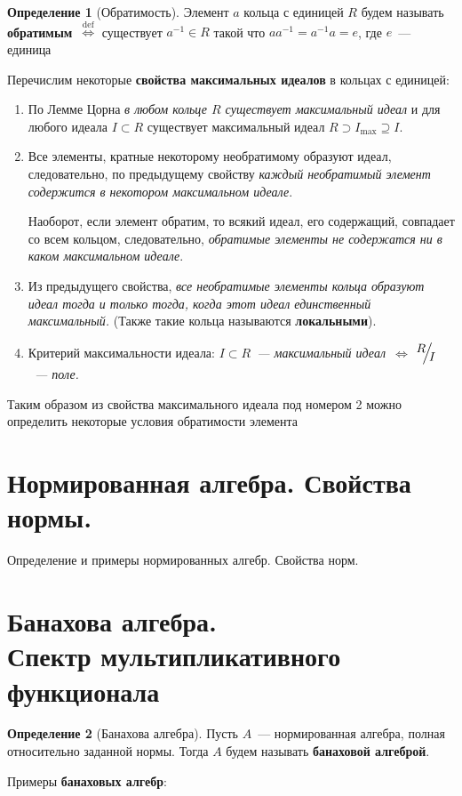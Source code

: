 \documentclass[12pt]{extarticle}
\theoremstyle{definition}
\newtheorem{definition}{\indent Определение}[section]
\newcommand{\factor}[2]{\raisebox{.35em}{$#1$}\kern-.27em\Big/\kern-.27em\raisebox{-.35em}{$#2$}}
\newcommand{\iffdef}{\stackrel{\mathrm{def}}{\iff}}
\begin{document}
    \begin{definition}[Обратимость]\label{def:Invertibility}
        Элемент $a$ кольца с единицей $R$ будем называть \textbf{обратимым}~$\iffdef$ существует $a^{-1}\in R$ такой что $aa^{-1}=a^{-1}a=e$, где $e$~--- единица
    \end{definition}
    Перечислим некоторые \textbf{свойства максимальных идеалов} в кольцах с единицей:
    \begin{enumerate}
        \item По Лемме Цорна \textit{в любом кольце $R$ существует максимальный идеал} и для любого идеала $I\subset R$ существует максимальный идеал $R\supset I_{\max}\supseteq I$.
        \item Все элементы, кратные некоторому необратимому образуют идеал, следовательно, по предыдущему свойству \textit{каждый необратимый элемент  содержится в некотором максимальном идеале}.

        Наоборот, если элемент обратим, то всякий идеал, его содержащий, совпадает со всем кольцом, следовательно, \textit{обратимые элементы не содержатся ни в каком максимальном идеале}.
        \item Из предыдущего свойства, \textit{все необратимые элементы кольца образуют идеал тогда и только тогда, когда этот идеал единственный максимальный.} (Также такие кольца называются \textbf{локальными}).
        \item Критерий максимальности идеала: \textit{$I\subset R$~--- максимальный идеал~$\iff$ $\factor{R}{I}$~--- поле.}
    \end{enumerate}

    Таким образом из свойства максимального идеала под номером 2 можно определить некоторые условия обратимости элемента

    \section[Нормы и нормированные алгебры]{Нормированная алгебра. Свойства нормы.}
        Определение и примеры нормированных алгебр. Свойства норм.

    \section[Банаховы алгебры. Спектр]{Банахова алгебра.\\Спектр мультипликативного функционала}
      \begin{definition}[Банахова алгебра]\label{def:Banach algebra}
        Пусть $A$~--- нормированная алгебра, полная относительно заданной нормы. Тогда $A$ будем называть \textbf{банаховой алгеброй}.
        \end{definition}
        Примеры \textbf{банаховых алгебр}:
\end{document}
